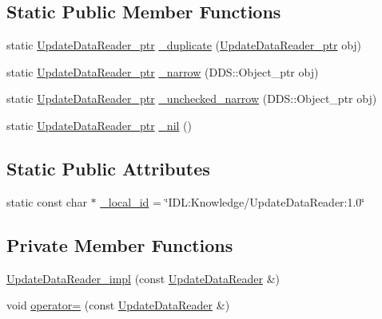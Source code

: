 \subsection*{Static Public Member Functions}
\begin{DoxyCompactItemize}
\item 
static \hyperlink{classKnowledge_1_1UpdateDataReader}{UpdateDataReader\_\-ptr} \hyperlink{classKnowledge_1_1UpdateDataReader_a993f2375983266927ca22f109ebd57a8}{\_\-duplicate} (\hyperlink{classKnowledge_1_1UpdateDataReader}{UpdateDataReader\_\-ptr} obj)
\item 
static \hyperlink{classKnowledge_1_1UpdateDataReader}{UpdateDataReader\_\-ptr} \hyperlink{classKnowledge_1_1UpdateDataReader_aae79abdf6d1190981cd0213eedcbcaa1}{\_\-narrow} (DDS::Object\_\-ptr obj)
\item 
static \hyperlink{classKnowledge_1_1UpdateDataReader}{UpdateDataReader\_\-ptr} \hyperlink{classKnowledge_1_1UpdateDataReader_a03462f93a84ec6639253405bd305594e}{\_\-unchecked\_\-narrow} (DDS::Object\_\-ptr obj)
\item 
static \hyperlink{classKnowledge_1_1UpdateDataReader}{UpdateDataReader\_\-ptr} \hyperlink{classKnowledge_1_1UpdateDataReader_a0954b4e17262e54b280c1cdfb9ead129}{\_\-nil} ()
\end{DoxyCompactItemize}
\subsection*{Static Public Attributes}
\begin{DoxyCompactItemize}
\item 
static const char $\ast$ \hyperlink{classKnowledge_1_1UpdateDataReader_ae66465e3f4a52332b3d16cc911c7b290}{\_\-local\_\-id} = \char`\"{}IDL:Knowledge/UpdateDataReader:1.0\char`\"{}
\end{DoxyCompactItemize}
\subsection*{Private Member Functions}
\begin{DoxyCompactItemize}
\item 
\hyperlink{classKnowledge_1_1UpdateDataReader__impl_a2b5263c954a0ca4c16772ba805389478}{UpdateDataReader\_\-impl} (const \hyperlink{classKnowledge_1_1UpdateDataReader}{UpdateDataReader} \&)
\item 
void \hyperlink{classKnowledge_1_1UpdateDataReader__impl_a30fad7f37d39b9486b23cc3744e4f314}{operator=} (const \hyperlink{classKnowledge_1_1UpdateDataReader}{UpdateDataReader} \&)
\end{DoxyCompactItemize}

